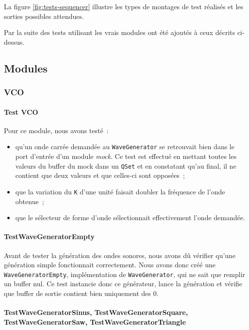 La figure \ref{fig:tests-sequencer} illustre les types de montages de test réalisés et les sorties possibles
attendues.

Par la suite des tests utilisant les vrais modules ont été ajoutés à ceux décrits ci-dessus.

\subsection{Modules}


\subsubsection{VCO}

\paragraph{Test VCO}

Pour ce module, nous avons testé~:
\begin{itemize}
    \item qu'un onde  carrée demandée au \texttt{WaveGenerator} se retrouvait bien dans le port d'entrée d'un module \textit{mock}. Ce test est effectué en mettant toutes les valeurs du buffer du mock dans un \verb!QSet! et en constatant qu'au final, il ne contient que deux valeurs et que celles-ci sont opposées~;
    \item que la variation du \texttt{K} d'une unité faisait doubler la fréquence de l'onde obtenue~;
    \item que le sélecteur de forme d'onde sélectionnait effectivement l'onde demandée.
\end{itemize}

\paragraph{TestWaveGeneratorEmpty}

Avant de tester la génération des ondes sonores, nous avons dû
vérifier qu'une génération simple fonctionnait correctement. Nous
avons donc créé une \verb!WaveGeneratorEmpty!, implémentation de
\verb!WaveGenerator!, qui ne sait que remplir un buffer nul. Ce
test instancie donc ce générateur, lance la génération et vérifie
que buffer de sortie contient bien uniquement des 0.

\paragraph{TestWaveGeneratorSinus, TestWaveGeneratorSquare, TestWaveGeneratorSaw, TestWaveGeneratorTriangle}

